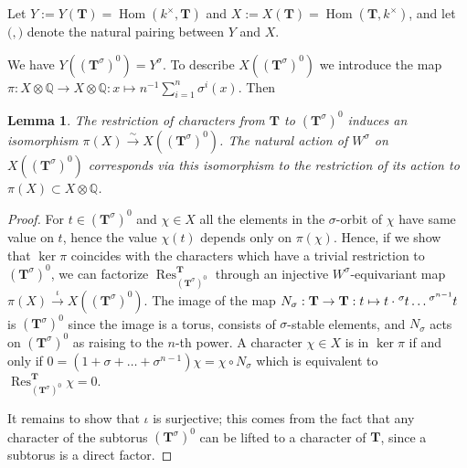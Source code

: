 \documentclass{amsart}
\newtheorem{lemma}[equation]{Lemma}
\numberwithin{equation}{section}
\theoremstyle{definition}
\theoremstyle{remark}
\newcommand\bT{{\mathbf T}}
\newcommand\BQ{{\mathbb Q}}
\newcommand\Tso{{(\bT^\sigma)^0}}
\newcommand\lexp[2]{\kern\scriptspace\vphantom{#2}^{#1}\kern-\scriptspace#2}
\newcommand\inv{^{-1}}
\DeclareMathOperator\Hom{\mathrm{Hom}}
\DeclareMathOperator\Res{\mathrm{Res}}
\newcommand\pairing[2]{{\mathopen(#1,#2\mathclose)}}
\begin{document}
Let $Y:=Y(\bT)=\Hom(k^\times,\bT)$ and $X:=X(\bT)=\Hom(\bT,k^\times)$,
 and let $\pairing{}{}$ denote the natural
pairing between $Y$ and $X$.

We have $Y(\Tso)=Y^\sigma$.
To describe $X(\Tso)$ we introduce the map $\pi:X\otimes\BQ\to
X\otimes\BQ:x\mapsto n\inv\sum_{i=1}^n\sigma^i(x)$. 
Then 
\begin{lemma}\label{X(Tso)} The restriction of
characters from $\bT$ to $\Tso$ induces an isomorphism 
$ \pi(X)\xrightarrow\sim X(\Tso)$.
The natural action of $W^\sigma$ on $X(\Tso)$ corresponds via this isomorphism
to the restriction of its action to $\pi(X)\subset X\otimes\BQ$.
\end{lemma}
\begin{proof}For $t\in\Tso$ and $\chi\in X$
all the elements in the $\sigma$-orbit of $\chi$ have same value on $t$, hence
the value $\chi(t)$ depends only on $\pi(\chi)$. 
Hence, if we show that $\ker\pi$ coincides with the characters which have 
a trivial restriction to
$\Tso$, we can factorize $\Res^\bT_\Tso$
through an injective 
$W^\sigma$-equivariant map  $\pi(X)\xrightarrow\iota X(\Tso)$.
The image of the map $N_\sigma:\bT\to\bT:t\mapsto
t\cdot\lexp\sigma t\ldots\lexp{\sigma^{n-1}}t$
is $\Tso$ since the image is a torus, consists of $\sigma$-stable elements, 
and $N_\sigma$ acts on $\Tso$ as raising to the $n$-th power. 
A character $\chi\in X$ is in
$\ker\pi$ if and only if $0=(1+\sigma+\ldots+\sigma^{n-1})\chi=
\chi\circ N_\sigma$ which is equivalent to $\Res^\bT_\Tso\chi=0$. 

It remains to show that $\iota$ is surjective; this comes from the
fact that any character of the subtorus $\Tso$ can be lifted to a character of
$\bT$, since a subtorus is a direct factor. 
\end{proof}
\end{document}
